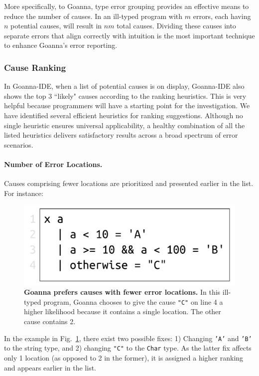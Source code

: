 	More specifically, to Goanna, type error grouping provides an effective means to reduce the number of causes. In an ill-typed program with $m$ errors, each having $n$ potential causes, will result in $nm$ total causes. Dividing these causes into separate errors that align correctly with intuition is the most important technique to enhance Goanna's error reporting.

    \subsubsection{Cause Ranking} \label{sub:ranking}
     In Goanna-IDE, when a list of potential causes is on display, Goanna-IDE also shows the top 3 ``likely" causes according to the ranking heuristics. This is very helpful because programmers will have a starting point for the investigation. We have identified several efficient heuristics for ranking suggestions. Although no single heuristic ensures universal applicability,  a healthy combination of all the listed heuristics delivers satisfactory results across a broad spectrum of error scenarios.

    \paragraph{Number of Error Locations.}
    Causes comprising fewer locations are prioritized and presented earlier in the list. For instance:
   \begin{figure}[htb!]
        \centering
        \includegraphics[width=0.5\linewidth]{images/Loc-Count}
        \caption{\textbf{Goanna prefers causes with fewer error locations.} In this ill-typed program, Goanna chooses to give the cause \texttt{"C"} on line 4 a higher likelihood because it contains a single location. The other cause contains 2. }
        \label{fig:loc-count}
    \end{figure}

    In the example in Fig.~\ref{fig:loc-count}, there exist two possible fixes: 1) Changing \texttt{'A'} and \texttt{'B'} to the string type, and 2) changing \texttt{"C"} to the \texttt{Char} type. As the latter fix affects only 1 location (as opposed to 2 in the former), it is assigned a higher ranking and appears earlier in the list.

